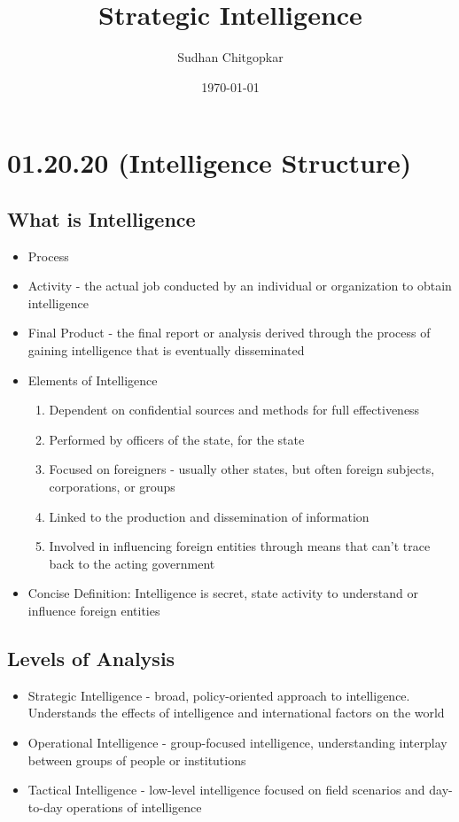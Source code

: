 \documentclass[11pt]{article}
\author{Sudhan Chitgopkar}
\date{\today}
\title{Strategic Intelligence}
\begin{document}
\maketitle
\tableofcontents \clearpage\section{01.20.20 (Intelligence Structure)}
\label{sec:orgbeb453e}
\subsection{What is Intelligence}
\label{sec:org60a9d40}
\begin{itemize}
\item Process
\item Activity - the actual job conducted by an individual or organization to obtain intelligence
\item Final Product - the final report or analysis derived through the process of gaining intelligence that is eventually disseminated
\item Elements of Intelligence
\begin{enumerate}
\item Dependent on confidential sources and methods for full effectiveness
\item Performed by officers of the state, for the state
\item Focused on foreigners - usually other states, but often foreign subjects, corporations, or groups
\item Linked to the production and dissemination of information
\item Involved in influencing foreign entities through means that can't trace back to the acting government
\end{enumerate}
\item Concise Definition: Intelligence is secret, state activity to understand or influence foreign entities
\end{itemize}
\subsection{Levels of Analysis}
\label{sec:org042f092}
\begin{itemize}
\item Strategic Intelligence - broad, policy-oriented approach to intelligence. Understands the effects of intelligence and international factors on the world
\item Operational Intelligence - group-focused intelligence, understanding interplay between groups of people or institutions
\item Tactical Intelligence - low-level intelligence focused on field scenarios and day-to-day operations of intelligence
\end{itemize}
\end{document}
